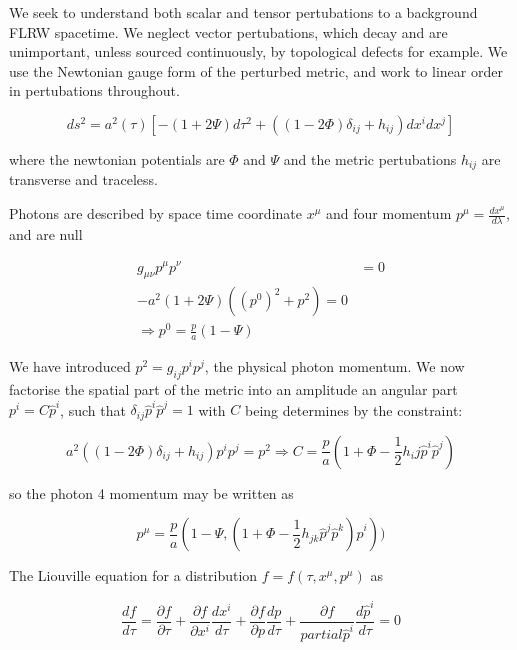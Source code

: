 \documentclass[a4paper,10pt]{article}
\newcommand{\half}{\frac{1}{2}}
\begin{document}
We seek to understand both scalar and tensor pertubations to a background FLRW spacetime. We neglect vector pertubations, which decay and are unimportant, unless sourced continuously, by topological defects for example. We use the Newtonian gauge form of the perturbed metric, and work to linear order in pertubations throughout.

\begin{equation}
ds^2 = a^2(\tau) [-(1+2\Psi)d\tau^2 + ((1-2\Phi)\delta_{ij} +h_{ij})dx^idx^j]
\label{perturbmetric}
\end{equation}

where the newtonian potentials are $\Phi$ and $\Psi$ and the metric pertubations $h_{ij}$ are transverse and traceless. 


Photons are described by space time coordinate $x^\mu$ and four momentum $p^\mu=\frac{dx^\mu}{d\lambda}$, and are null

\begin{equation}\begin{split}
g_{\mu\nu}p^\mu p^\nu&=0\\
-a^2(1+2\Psi)((p^0)^2 + p^2) = 0\\
\Rightarrow p^0 = \frac{p}{a}(1-\Psi)
\end{split}\end{equation}

We have introduced $p^2=g_{ij}p^ip^j$, the physical photon momentum. We now factorise the spatial part of the metric into an amplitude an angular part $p^i = C\hat{p}^i$, such that $\delta_{ij}\hat{p}^i\hat{p}^j=1$ with $C$ being determines by the constraint:

\begin{equation}
a^2((1-2\Phi)\delta_{ij}+h_{ij})p^ip^j = p^2 \Rightarrow C=\frac{p}{a}(1+\Phi-\half h_ij\hat{p}^i\hat{p}^j)
\end{equation}

so the photon 4 momentum may be written as 

\begin{equation}
p^\mu = \frac{p}{a}(1-\Psi, (1+\Phi-\half h_{jk}\hat{p}^j\hat{p}^k)\hat{p}^i))
\end{equation}

The Liouville equation for a distribution $f=f(\tau, x^\mu, p^\mu)$ as

\begin{equation}
\frac{df}{d\tau} = \frac{\partial f}{\partial\tau} + \frac{\partial f}{\partial x^i} \frac{dx^i}{d\tau} + \frac{\partial f}{\partial p} \frac{dp}{d\tau} + \frac{\partial f}{partial\hat{p}^i} \frac{d\hat{p}^i}{d\tau}  = 0
\label{Liouville}
\end{equation}
\end{document}
